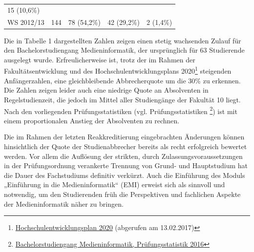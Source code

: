 \begin{longtable}[]{@{}lllll@{}}
\begin{minipage}[t]{0.16\columnwidth}
15 (10,6\%)\strut
\end{minipage}\tabularnewline
\begin{minipage}[t]{0.11\columnwidth}\raggedright\strut
WS 2012/13\strut
\end{minipage} & \begin{minipage}[t]{0.23\columnwidth}\raggedright\strut
144\strut
\end{minipage} & \begin{minipage}[t]{0.22\columnwidth}\raggedright\strut
78 (54,2\%)\strut
\end{minipage} & \begin{minipage}[t]{0.14\columnwidth}\raggedright\strut
42 (29,2\%)\strut
\end{minipage} & \begin{minipage}[t]{0.16\columnwidth}\raggedright\strut
2 (1,4\%)\strut
\end{minipage}\tabularnewline
\bottomrule
\end{longtable}

Die in Tabelle 1 dargestellten Zahlen zeigen einen stetig wachsenden
Zulauf für den Bachelorstudiengang Medieninformatik, der ursprünglich
für 63 Studierende ausgelegt wurde. Erfreulicherweise ist, trotz der im
Rahmen der Fakultätsentwicklung und des Hochschulentwicklungsplans
2020\footnote{\href{https://www.verwaltung.th-koeln.de/imperia/md/content/verwaltung/broschueren_leitfaeden/hochschulentwicklungsplan2020.pdf}{Hochschulentwicklungsplan
  2020} (abgerufen am 13.02.2017)} steigenden Anfängerzahlen, eine
gleichbleibende Abbrecherquote um die 30\% zu erkennen. Die Zahlen
zeigen leider auch eine niedrige Quote an Absolventen in
Regelstudienzeit, die jedoch im Mittel aller Studiengänge der Fakultät
10 liegt. Nach den vorliegenden Prüfungsstatistiken (vgl.
Prüfungsstatistiken \footnote{\href{../anhaenge/pruefungsstatistiken.pdf}{Bachelorstudiengang
  Medieninformatik, Prüfungsstatistik 2016}}) ist mit einem
proportionalen Anstieg der Absolventen zu rechnen.

Die im Rahmen der letzten Reakkreditierung eingebrachten Änderungen
können hinsichtlich der Quote der Studienabbrecher bereits als recht
erfolgreich bewertet werden. Vor allem die Auflösung der strikten, durch
Zulassungsvoraussetzungen in der Prüfungsordnung verankerte Trennung von
Grund- und Hauptstudium hat die Dauer des Fachstudiums definitiv
verkürzt. Auch die Einführung des Moduls „Einführung in die
Medieninformatik`` (EMI) erweist sich als sinnvoll und notwendig, um den
Studierenden früh die Perspektiven und fachlichen Aspekte der
Medieninformatik näher zu bringen.

